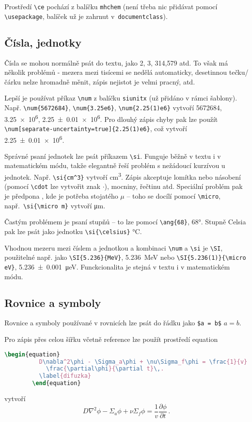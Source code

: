 \documentclass{cygclanek}
\begin{document}
Prostředí \verb|\ce| pochází z balíčku \verb|mhchem| \cite{ctan_mhchem} (není třeba nic přidávat 
pomocí \verb|\usepackage|, balíček už je zahrnut v~\verb|documentclass|).

\subsection{Čísla, jednotky}
Čísla se mohou normálně psát do textu, jako 2, 3, 314,579 atd. To však má několik 
problémů - mezera mezi tisícemi se nedělá automaticky, desetinnou tečku/čárku nelze hromadně měnit, 
zápis nejistot je velmi pracný, atd.

Lepší je používat příkaz \verb|\num| z balíčku \verb|siunitx| \cite{ctan_siunitx} (už přidáno 
v rámci šablony). Např. \verb|\num{5672684}|, \verb|\num{3.25e6}|, \verb|\num{2.25(1)e6}| vytvoří 
\num{5672684}, \num{3.25e6}, \num{2.25(1)e6}. Pro dlouhý zápis chyby pak lze použít 
\verb|\num[separate-uncertainty=true]{2.25(1)e6}|, což vytvoří \num[separate-uncertainty=true]{2.25(1)e6}.

    Správné psaní jednotek lze psát příkazem \verb|\si|. Funguje běžně v textu i v matematickém módu, takže 
    elegantně řeší problém s nežádoucí kurzívou u jednotek. Např. \verb|\si{cm^3}| vytvoří \si{cm^3}. 
    Zápis akceptuje lomítka nebo násobení (pomocí \verb|\cdot| lze vytvořit znak $\cdot$), mocniny, řečtinu atd. 
    Speciální problém pak je předpona , kde je potřeba stojatého $\mu$ -- toho se docílí pomocí 
    \verb|\micro|, např.~\verb|\si{\micro m}| vytvoří \si{\micro m}. 

    Častým problémem je psaní stupňů -- to lze pomocí \verb|\ang{68}|, \ang{68}. Stupně Celsia pak lze psát 
    jako jednotku \verb|\si{\celsius}| \si{\celsius}.


Vhodnou mezeru mezi číslem a jednotkou a kombinaci \verb|\num| a \verb|\si| je \verb|\SI|, použitelné např.
    jako \verb|\SI{5.236}{MeV}|, \SI{5.236}{MeV} nebo \verb|\SI{5.236(1)}{\micro eV}|, \SI{5.236(1)}{\micro eV}. 
    Funckcionalita je stejná v textu i v matematickém módu.


\subsection{Rovnice a symboly}
Rovnice a symboly používané v rovnicích lze psát do řádku jako \verb|$a = b$| $a = b$. 

Pro zápis přes celou šířku včetně reference lze použít prostředí equation
    \begin{lstlisting}[language=TeX]
        \begin{equation}
          D\nabla^2\phi - \Sigma_a\phi + \nu\Sigma_f\phi = \frac{1}{v}
            \frac{\partial\phi}{\partial t}\,.
          \label{difuzka}
        \end{equation}
    \end{lstlisting}
    vytvoří 
\begin{equation}
  D\nabla^2\phi - \Sigma_a\phi + \nu\Sigma_f\phi = \frac{1}{v}\frac{\partial
  \phi}{\partial t}\,.
  \label{difuzka}
\end{equation}
\end{document}
